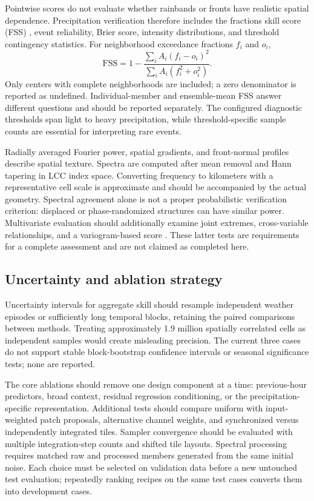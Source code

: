 \documentclass[10pt]{article}
\begin{document}
Pointwise scores do not evaluate whether rainbands or fronts have realistic spatial dependence. Precipitation verification therefore includes the fractions skill score (FSS) \citep{roberts2008}, event reliability, Brier score, intensity distributions, and threshold contingency statistics. For neighborhood exceedance fractions $f_i$ and $o_i$,
\begin{equation}
\mathrm{FSS}=1-\frac{\sum_i A_i(f_i-o_i)^2}
{\sum_i A_i(f_i^2+o_i^2)}.
\end{equation}
Only centers with complete neighborhoods are included; a zero denominator is reported as undefined. Individual-member and ensemble-mean FSS answer different questions and should be reported separately. The configured diagnostic thresholds span light to heavy precipitation, while threshold-specific sample counts are essential for interpreting rare events.

Radially averaged Fourier power, spatial gradients, and front-normal profiles describe spatial texture. Spectra are computed after mean removal and Hann tapering in LCC index space. Converting frequency to kilometers with a representative cell scale is approximate and should be accompanied by the actual geometry. Spectral agreement alone is not a proper probabilistic verification criterion: displaced or phase-randomized structures can have similar power. Multivariate evaluation should additionally examine joint extremes, cross-variable relationships, and a variogram-based score \citep{scheuerer2015}. These latter tests are requirements for a complete assessment and are not claimed as completed here.

\subsection{Uncertainty and ablation strategy}\label{sec:ablation}
Uncertainty intervals for aggregate skill should resample independent weather episodes or sufficiently long temporal blocks, retaining the paired comparisons between methods. Treating approximately 1.9 million spatially correlated cells as independent samples would create misleading precision. The current three cases do not support stable block-bootstrap confidence intervals or seasonal significance tests; none are reported.

The core ablations should remove one design component at a time: previous-hour predictors, broad context, residual regression conditioning, or the precipitation-specific representation. Additional tests should compare uniform with input-weighted patch proposals, alternative channel weights, and synchronized versus independently integrated tiles. Sampler convergence should be evaluated with multiple integration-step counts and shifted tile layouts. Spectral processing requires matched raw and processed members generated from the same initial noise. Each choice must be selected on validation data before a new untouched test evaluation; repeatedly ranking recipes on the same test cases converts them into development cases.
\end{document}
